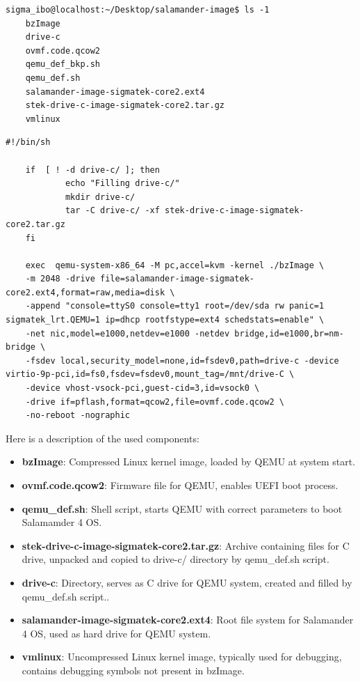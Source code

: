 \documentclass[MMR,Master,english]{twbook}
\begin{document}
\vspace{1em}
\begin{minipage}{\linewidth}
    \begin{lstlisting}[name={Contents of QEMU folder for Salamander 4},label={lst:ls}]
    sigma_ibo@localhost:~/Desktop/salamander-image$ ls -1
    bzImage
    drive-c
    ovmf.code.qcow2
    qemu_def_bkp.sh
    qemu_def.sh
    salamander-image-sigmatek-core2.ext4
    stek-drive-c-image-sigmatek-core2.tar.gz
    vmlinux
    \end{lstlisting}
    \end{minipage}
    


\vspace{1em}
\begin{minipage}{\linewidth}
\begin{lstlisting}[name={QEMU script for starting Salamander 4 virtualisation},label={lst:qemu_def}]
    #!/bin/sh

    if  [ ! -d drive-c/ ]; then
            echo "Filling drive-c/"
            mkdir drive-c/
            tar -C drive-c/ -xf stek-drive-c-image-sigmatek-core2.tar.gz
    fi
    
    exec  qemu-system-x86_64 -M pc,accel=kvm -kernel ./bzImage \
    -m 2048 -drive file=salamander-image-sigmatek-core2.ext4,format=raw,media=disk \
    -append "console=ttyS0 console=tty1 root=/dev/sda rw panic=1 sigmatek_lrt.QEMU=1 ip=dhcp rootfstype=ext4 schedstats=enable" \
    -net nic,model=e1000,netdev=e1000 -netdev bridge,id=e1000,br=nm-bridge \
    -fsdev local,security_model=none,id=fsdev0,path=drive-c -device virtio-9p-pci,id=fs0,fsdev=fsdev0,mount_tag=/mnt/drive-C \
    -device vhost-vsock-pci,guest-cid=3,id=vsock0 \
    -drive if=pflash,format=qcow2,file=ovmf.code.qcow2 \
    -no-reboot -nographic
\end{lstlisting}
\end{minipage}

Here is a description of the used components:
\begin{itemize}
    \item \textbf{bzImage}: Compressed Linux kernel image, loaded by QEMU at system start.
    \item \textbf{ovmf.code.qcow2}: Firmware file for QEMU, enables UEFI boot process.
    \item \textbf{qemu\_def.sh}: Shell script, starts QEMU with correct parameters to boot Salamamder 4 OS.
    \item \textbf{stek-drive-c-image-sigmatek-core2.tar.gz}: Archive containing files for C drive, unpacked and copied to drive-c/ directory by qemu\_def.sh script.
    \item \textbf{drive-c}: Directory, serves as C drive for QEMU system, created and filled by qemu\_def.sh script..
    \item \textbf{salamander-image-sigmatek-core2.ext4}: Root file system for Salamander 4 OS, used as hard drive for QEMU system.
    \item \textbf{vmlinux}: Uncompressed Linux kernel image, typically used for debugging, contains debugging symbols not present in bzImage.
\end{itemize}
\end{document}
